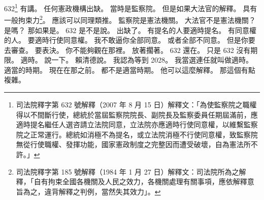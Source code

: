 \hypertarget{w01:cue:1305}{}632\footnote{司法院釋字第 632 號解釋（2007 年 8 月 15 日）解釋文：「為使監察院之職權得以不間斷行使，總統於當屆監察院院長、副院長及監察委員任期屆滿前，應適時提名繼任人選咨請立法院同意，立法院亦應適時行使同意權，以維繫監察院之正常運行。總統如消極不為提名，或立法院消極不行使同意權，致監察院無從行使職權、發揮功能，國家憲政制度之完整因而遭受破壞，自為憲法所不許。」} 有講。
\hypertarget{w01:cue:1306}{}任何憲政機構出缺。
\hypertarget{w01:cue:1307}{}當時是監察院。
\hypertarget{w01:cue:1308}{}但是如果大法官的解釋。
\hypertarget{w01:cue:1309}{}具有一般拘束力\footnote{司法院釋字第 185 號解釋（1984 年 1 月 27 日）解釋文：司法院所為之解釋，「自有拘束全國各機關及人民之效力，各機關處理有關事項，應依解釋意旨為之，違背解釋之判例，當然失其效力」。}。
\hypertarget{w01:cue:1310}{}應該可以同理類推。
\hypertarget{w01:cue:1311}{}監察院是憲法機關。
\hypertarget{w01:cue:1312}{}大法官不是憲法機關？
\hypertarget{w01:cue:1313}{}是嗎？
\hypertarget{w01:cue:1314}{}那如果是。
\hypertarget{w01:cue:1315}{}632 是不是說。
\hypertarget{w01:cue:1316}{}出缺了。
\hypertarget{w01:cue:1317}{}有提名的人要適時提名。
\hypertarget{w01:cue:1318}{}有同意權的人。
\hypertarget{w01:cue:1319}{}要適時行使同意權。
\hypertarget{w01:cue:1320}{}我不敢逼你全部同意。
\hypertarget{w01:cue:1321}{}或者全部不同意。
\hypertarget{w01:cue:1322}{}但是你要去審查。
\hypertarget{w01:cue:1323}{}要表決。
\hypertarget{w01:cue:1324}{}你不能夠觀在那裡。
\hypertarget{w01:cue:1325}{}放著擱著。
\hypertarget{w01:cue:1326}{}632 還在。
\hypertarget{w01:cue:1327}{}只是 632 沒有期限。
\hypertarget{w01:cue:1328}{}適時。
\hypertarget{w01:cue:1329}{}說一下。
\hypertarget{w01:cue:1330}{}賴清德說。
\hypertarget{w01:cue:1331}{}我認為等到 2028。
\hypertarget{w01:cue:1332}{}我當選連任就叫做適時。
\hypertarget{w01:cue:1333}{}適當的時期。
\hypertarget{w01:cue:1334}{}現在在那之前。
\hypertarget{w01:cue:1335}{}都不是適當時期。
\hypertarget{w01:cue:1336}{}他可以這麼解釋。
\hypertarget{w01:cue:1337}{}那這個有點複雜。

